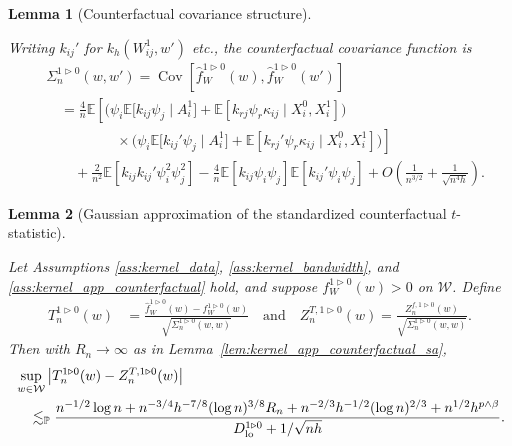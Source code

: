 \documentclass[11pt,lof]{puthesis}
\renewcommand{\P}{\ensuremath{\mathbb{P}}}
\newcommand{\E}{\ensuremath{\mathbb{E}}}
\newcommand{\cW}{\ensuremath{\mathcal{W}}}
\newcommand{\Dl}{\ensuremath{D_{\textup{lo}}}}
\DeclareMathOperator{\Cov}{Cov}
\theoremstyle{break}
\newtheorem{lemma}{Lemma}[section]
\theoremstyle{proof}
\begin{document}
\begin{lemma}[Counterfactual covariance structure]
  \label{lem:kernel_app_counterfactual_covariance_structure}

  Writing $k_{i j}'$ for $k_h(W_{i j}^1, w')$ etc.,
  the counterfactual covariance function is
  \begin{align*}
    &\Sigma_n^{1 \triangleright 0}(w,w')
    = \Cov\left[
      \hat f_W^{1 \triangleright 0}(w),
      \hat f_W^{1 \triangleright 0}(w')
    \right] \\
    &\quad=
    \frac{4}{n}
    \E\left[
      \Big(
        \psi_i
        \E\big[
          k_{i j} \psi_j
          \mid A_i^1
        \big]
        + \E\left[
          k_{r j} \psi_r
          \kappa_{i j}
          \mid X_i^0, X_i^1
        \right]
      \Big)
      \right. \\
      &\left.
      \qquad\qquad\quad
      \times
      \Big(
        \psi_i
        \E\big[
          k_{i j}' \psi_j
          \mid A_i^1
        \big]
        + \E\left[
          k_{r j}' \psi_r \kappa_{i j}
          \mid X_i^0, X_i^1
        \right]
      \Big)
    \right] \\
    &\qquad+
    \frac{2}{n^2}
    \E\left[
      k_{i j} k_{i j}'
      \psi_i^2 \psi_j^2
    \right]
    - \frac{4}{n}
    \E\left[
      k_{i j} \psi_i \psi_j
    \right]
    \E\left[
      k_{i j}' \psi_i \psi_j
    \right]
    + O\left( \frac{1}{n^{3/2}} + \frac{1}{\sqrt{n^4h}} \right).
  \end{align*}

\end{lemma}

\begin{lemma}[Gaussian approximation
  of the standardized counterfactual $t$-statistic]
  \label{lem:kernel_app_counterfactual_infeasible_t_statistic}

  Let Assumptions \ref{ass:kernel_data},
  \ref{ass:kernel_bandwidth}, and
  \ref{ass:kernel_app_counterfactual}
  hold, and suppose
  $f_W^{1 \triangleright 0}(w) > 0$ on $\cW$.
  Define
  \begin{align*}
    T_n^{1 \triangleright 0}(w)
    &= \frac{\hat f_W^{1 \triangleright 0}(w)
    - f_W^{1 \triangleright 0}(w)}
    {\sqrt{\Sigma_n^{1 \triangleright 0}(w,w)}}
    \quad\text{and}\quad
    Z_n^{T, 1 \triangleright 0}(w)
    = \frac{Z_n^{f, 1 \triangleright 0}(w)}
    {\sqrt{\Sigma_n^{1 \triangleright 0}(w,w)}}.
  \end{align*}
  Then with $R_n \to \infty$ as in Lemma~\ref{lem:kernel_app_counterfactual_sa},
  \begin{align*}
    &\sup_{w \in \cW}
    \left|
    T_n^{1 \triangleright 0}(w) - Z_n^{T, 1 \triangleright 0}(w)
    \right| \\
    &\quad\lesssim_\P
    \frac{
      n^{-1/2} \log n
      + n^{-3/4} h^{-7/8} (\log n)^{3/8} R_n
      + n^{-2/3} h^{-1/2} (\log n)^{2/3}
    + n^{1/2} h^{p \wedge \beta}}
    {\Dl^{1 \triangleright 0} + 1/\sqrt{n h}}.
  \end{align*}

\end{lemma}
\end{document}
